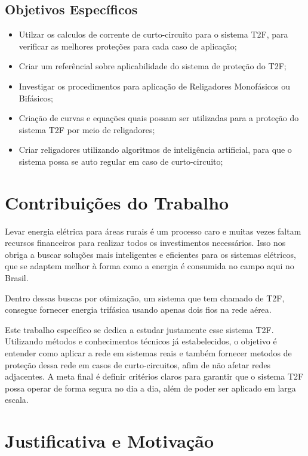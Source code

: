 \documentclass[oneside,openright,12pt]{ufsm_2021} %
\begin{document}
\subsection{Objetivos Específicos}
\begin{itemize}
	\item Utilzar os calculos de corrente de curto-circuito para o sistema T2F, para verificar as melhores proteções para cada caso de aplicação;
	\item Criar um referêncial sobre aplicabilidade do sistema de proteção do T2F;
	\item Investigar os procedimentos para aplicação de Religadores Monofásicos ou Bifásicos;
	\item Criação de curvas e equações quais possam ser utilizadas para a proteção do sistema T2F por meio de religadores;
	\item Criar religadores utilizando algoritmos de inteligência artificial, para que o sistema possa se auto regular em caso de curto-circuito;
\end{itemize}

\section{Contribuições do Trabalho}
\par Levar energia elétrica para áreas rurais é um processo caro e muitas vezes faltam recursos financeiros para realizar todos os investimentos necessários. Isso nos obriga a buscar soluções mais inteligentes e eficientes para os sistemas elétricos, que se adaptem melhor à forma como a energia é consumida no campo aqui no Brasil.

\par Dentro dessas buscas por otimização, um sistema que tem chamado de T2F, consegue fornecer energia trifásica usando apenas dois fios na rede aérea.

\par Este trabalho específico se dedica a estudar justamente esse sistema T2F. Utilizando métodos e conhecimentos técnicos já estabelecidos, o objetivo é entender como aplicar a rede em sistemas reais e também fornecer metodos de proteção dessa rede em casos de curto-circuitos, afim de não afetar redes adjacentes. A meta final é definir critérios claros para garantir que o sistema T2F possa operar de forma segura no dia a dia, além de poder ser aplicado em larga escala.

\section{Justificativa e Motivação}
\end{document}
